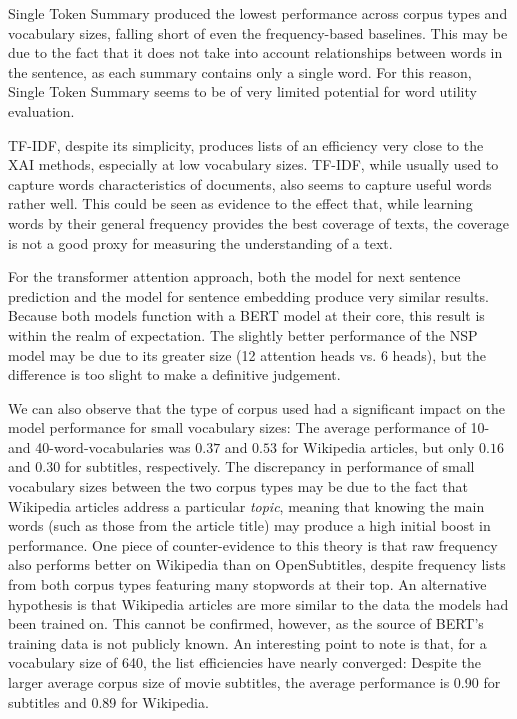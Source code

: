 Single Token Summary produced the lowest performance across corpus types and vocabulary sizes, falling short of even the frequency-based baselines.
This may be due to the fact that it does not take into account relationships between words in the sentence, as each summary contains only a single word.
For this reason, Single Token Summary seems to be of very limited potential for word utility evaluation.

TF-IDF, despite its simplicity, produces lists of an efficiency very close to the XAI methods, especially at low vocabulary sizes.
TF-IDF, while usually used to capture words characteristics of documents, also seems to capture useful words rather well.
This could be seen as evidence to the effect that, while learning words by their general frequency provides the best coverage of texts, the coverage is not a good proxy for measuring the understanding of a text.


For the transformer attention approach, both the model for next sentence prediction and the model for sentence embedding produce very similar results.
Because both models function with a BERT model at their core, this result is within the realm of expectation.
The slightly better performance of the NSP model may be due to its greater size (12 attention heads vs. 6 heads), but the difference is too slight to make a definitive judgement.

We can also observe that the type of corpus used had a significant impact on the model performance for small vocabulary sizes:
The average performance of 10- and 40-word-vocabularies was $0.37$ and $0.53$ for Wikipedia articles, but only $0.16$ and $0.30$ for subtitles, respectively.
The discrepancy in performance of small vocabulary sizes between the two corpus types may be due to the fact that Wikipedia articles address a particular \textit{topic}, meaning that knowing the main words (such as those from the article title) may produce a high initial boost in performance.
One piece of counter-evidence to this theory is that raw frequency also performs better on Wikipedia than on OpenSubtitles, despite frequency lists from both corpus types featuring many stopwords at their top.
An alternative hypothesis is that Wikipedia articles are more similar to the data the models had been trained on.
This cannot be confirmed, however, as the source of BERT's training data is not publicly known.
An interesting point to note is that, for a vocabulary size of 640, the list efficiencies have nearly converged:
Despite the larger average corpus size of movie subtitles, the average performance is 0.90 for subtitles and 0.89 for Wikipedia.

